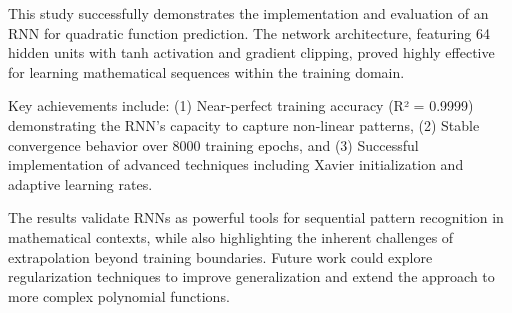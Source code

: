 \documentclass[11pt,a4paper]{article}
\begin{document}
This study successfully demonstrates the implementation and evaluation of an RNN for quadratic function prediction. The network architecture, featuring 64 hidden units with tanh activation and gradient clipping, proved highly effective for learning mathematical sequences within the training domain.

Key achievements include: (1) Near-perfect training accuracy (R² = 0.9999) demonstrating the RNN's capacity to capture non-linear patterns, (2) Stable convergence behavior over 8000 training epochs, and (3) Successful implementation of advanced techniques including Xavier initialization and adaptive learning rates.

The results validate RNNs as powerful tools for sequential pattern recognition in mathematical contexts, while also highlighting the inherent challenges of extrapolation beyond training boundaries. Future work could explore regularization techniques to improve generalization and extend the approach to more complex polynomial functions.
\end{document}
